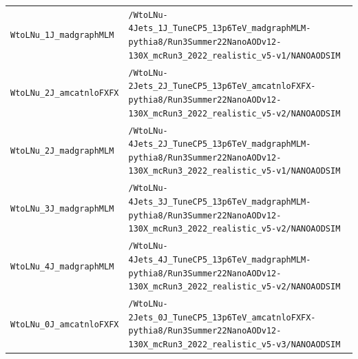 \begin{longtable}{@{}>{\RaggedRight\arraybackslash}p{} >{\RaggedRight\arraybackslash}p{}@{}}
\addlinespace[2pt]
\texttt{WtoLNu\_\allowbreak{}1J\_\allowbreak{}madgraphMLM} & \texttt{/\allowbreak{}WtoLNu-\allowbreak{}4Jets\_\allowbreak{}1J\_\allowbreak{}TuneCP5\_\allowbreak{}13p6TeV\_\allowbreak{}madgraphMLM-\allowbreak{}pythia8/\allowbreak{}Run3Summer22NanoAODv12-\allowbreak{}130X\_\allowbreak{}mcRun3\_\allowbreak{}2022\_\allowbreak{}realistic\_\allowbreak{}v5-\allowbreak{}v1/\allowbreak{}NANOAODSIM} \\
\addlinespace[2pt]
\texttt{WtoLNu\_\allowbreak{}2J\_\allowbreak{}amcatnloFXFX} & \texttt{/\allowbreak{}WtoLNu-\allowbreak{}2Jets\_\allowbreak{}2J\_\allowbreak{}TuneCP5\_\allowbreak{}13p6TeV\_\allowbreak{}amcatnloFXFX-\allowbreak{}pythia8/\allowbreak{}Run3Summer22NanoAODv12-\allowbreak{}130X\_\allowbreak{}mcRun3\_\allowbreak{}2022\_\allowbreak{}realistic\_\allowbreak{}v5-\allowbreak{}v2/\allowbreak{}NANOAODSIM} \\
\addlinespace[2pt]
\texttt{WtoLNu\_\allowbreak{}2J\_\allowbreak{}madgraphMLM} & \texttt{/\allowbreak{}WtoLNu-\allowbreak{}4Jets\_\allowbreak{}2J\_\allowbreak{}TuneCP5\_\allowbreak{}13p6TeV\_\allowbreak{}madgraphMLM-\allowbreak{}pythia8/\allowbreak{}Run3Summer22NanoAODv12-\allowbreak{}130X\_\allowbreak{}mcRun3\_\allowbreak{}2022\_\allowbreak{}realistic\_\allowbreak{}v5-\allowbreak{}v1/\allowbreak{}NANOAODSIM} \\
\addlinespace[2pt]
\texttt{WtoLNu\_\allowbreak{}3J\_\allowbreak{}madgraphMLM} & \texttt{/\allowbreak{}WtoLNu-\allowbreak{}4Jets\_\allowbreak{}3J\_\allowbreak{}TuneCP5\_\allowbreak{}13p6TeV\_\allowbreak{}madgraphMLM-\allowbreak{}pythia8/\allowbreak{}Run3Summer22NanoAODv12-\allowbreak{}130X\_\allowbreak{}mcRun3\_\allowbreak{}2022\_\allowbreak{}realistic\_\allowbreak{}v5-\allowbreak{}v2/\allowbreak{}NANOAODSIM} \\
\addlinespace[2pt]
\texttt{WtoLNu\_\allowbreak{}4J\_\allowbreak{}madgraphMLM} & \texttt{/\allowbreak{}WtoLNu-\allowbreak{}4Jets\_\allowbreak{}4J\_\allowbreak{}TuneCP5\_\allowbreak{}13p6TeV\_\allowbreak{}madgraphMLM-\allowbreak{}pythia8/\allowbreak{}Run3Summer22NanoAODv12-\allowbreak{}130X\_\allowbreak{}mcRun3\_\allowbreak{}2022\_\allowbreak{}realistic\_\allowbreak{}v5-\allowbreak{}v2/\allowbreak{}NANOAODSIM} \\
\addlinespace[2pt]
\texttt{WtoLNu\_\allowbreak{}0J\_\allowbreak{}amcatnloFXFX} & \texttt{/\allowbreak{}WtoLNu-\allowbreak{}2Jets\_\allowbreak{}0J\_\allowbreak{}TuneCP5\_\allowbreak{}13p6TeV\_\allowbreak{}amcatnloFXFX-\allowbreak{}pythia8/\allowbreak{}Run3Summer22NanoAODv12-\allowbreak{}130X\_\allowbreak{}mcRun3\_\allowbreak{}2022\_\allowbreak{}realistic\_\allowbreak{}v5-\allowbreak{}v3/\allowbreak{}NANOAODSIM} \\

\end{longtable}
